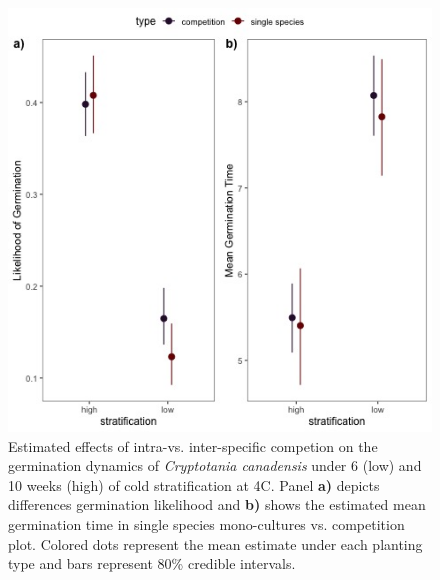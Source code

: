 \documentclass{article}\usepackage[]{graphicx}\usepackage[]{color}
\begin{document}
\begin{figure}[h!]
    \centering
\includegraphics[width=\textwidth]{..//figure/nichemodfication.jpeg}
   \caption{Estimated effects of intra-vs. inter-specific competion on the germination dynamics of \textit{Cryptotania canadensis} under 6 (low) and 10 weeks (high) of cold stratification at 4\degree C. Panel \textbf{a)} depicts differences germination likelihood and \textbf{b)} shows the estimated mean germination time in single species mono-cultures vs. competition plot. Colored dots represent the mean estimate under each planting type and bars represent 80\% credible intervals. } 
   \label{fig:nichemod}
\end{figure}
\end{document}
